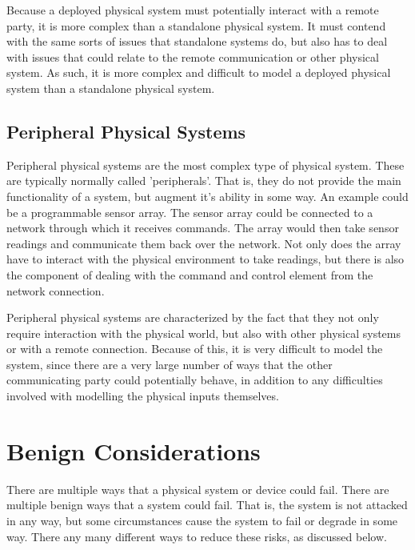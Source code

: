 Because a deployed physical system must potentially interact with a remote party, it is more complex than a standalone physical
system. It must contend with the same sorts of issues that standalone systems do, but also has to deal with issues that could
relate to the remote communication or other physical system.  As such, it is more complex and difficult to model a deployed
physical system than a standalone physical system.

\subsection*{Peripheral Physical Systems}
Peripheral physical systems are the most complex type of physical system. These are typically normally called 'peripherals'. That
is, they do not provide the main functionality of a system, but augment it's ability in some way. An example could be a 
programmable sensor array. The sensor array could be connected to a network through which it receives commands. The array
would then take sensor readings and communicate them back over the network. Not only does the array have to 
interact with the physical environment to take readings, but there is also the component of dealing with the
command and control element from the network connection.

Peripheral physical systems are characterized by the fact that they not only require interaction with the physical world, but
also with other physical systems or with a remote connection. Because of this, it is very difficult to model the system, since
there are a very large number of ways that the other communicating party could potentially behave, in addition to any difficulties
involved with modelling the physical inputs themselves. 


\section{Benign Considerations}
There are multiple ways that a physical system or device could fail. There are multiple benign ways that a system could
fail. That is, the system is not attacked in any way, but some circumstances cause the system to fail or degrade in some
way. There any many different ways to reduce these risks, as discussed below.


